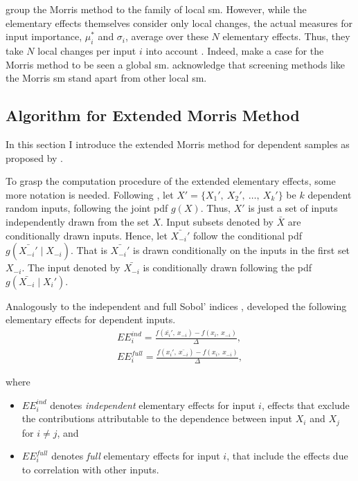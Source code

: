 \citet{BP16} group the Morris method to the family of local sm. However, while the elementary effects themselves consider only local changes, the actual measures for input importance, $\mu_i^\ast$ and $\sigma_i$, average over these $N$ elementary effects. Thus, they take $N$ local changes per input $i$ into account \citep{M91}. Indeed, \citet{CCS11} make a case for the Morris method to be seen a global sm. \citet{BP16} acknowledge that screening methods like the Morris sm stand apart from other local sm.

\subsection{Algorithm for Extended Morris Method}

In this section I introduce the extended Morris method for dependent samples as proposed by \citet{GM17}.

To grasp the computation procedure of the extended elementary effects, some more notation is needed. Following \citet{GM17}, let $X' = \{X_1',\ X_2',\ \dots,\ X_k'\}$ be $k$ dependent random inputs, following the joint pdf $g(X)$. Thus, $X'$ is just a set of inputs independently drawn from the set $X$. Input subsets denoted by $\bar{X}$ are conditionally drawn inputs. Hence, let $\bar{X_{-i}'}$ follow the conditional pdf $g(\bar{X_{-i}'} \mid X_{-i})$. That is $\bar{X_{-i}'}$ is drawn conditionally on the inputs in the first set $X_{-i}$. The input denoted by $\bar{X_{-i}}$ is conditionally drawn following the pdf $g(\bar{X_{-i}} \mid X_i')$. %

Analogously to the independent and full Sobol' indices \citep{MTA15}, \citet{GM17} developed the following elementary effects for dependent inputs.
\begin{align}
EE_i^{ind} = \frac{f(\bar{x_i}',\ x_{-i}) - f(x_i,\ x_{-i})}{\Delta},\\
EE_i^{full} = \frac{f(x_i',\ \bar{x_{-i}}) - f(x_i,\ x_{-i})}{\Delta},
\end{align}

\noindent where
\begin{itemize}
\item $EE_i^{ind}$ denotes \textit{independent} elementary effects for input $i$, effects that exclude the contributions attributable to the dependence between input $X_i$ and $X_j$ for $i \neq j$, and
\item $EE_i^{full}$ denotes \textit{full} elementary effects for input $i$, that include the effects due to correlation with other inputs.
\end{itemize}

